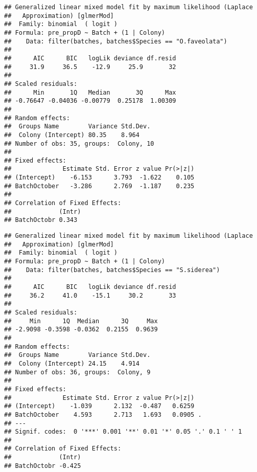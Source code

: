 \documentclass[]{article}
\newenvironment{Shaded}{\begin{snugshade}}{\end{snugshade}}
\newcommand{\CommentTok}[1]{\textcolor[rgb]{0.56,0.35,0.01}{\textit{#1}}}
\newcommand{\DataTypeTok}[1]{\textcolor[rgb]{0.13,0.29,0.53}{#1}}
\newcommand{\DecValTok}[1]{\textcolor[rgb]{0.00,0.00,0.81}{#1}}
\newcommand{\KeywordTok}[1]{\textcolor[rgb]{0.13,0.29,0.53}{\textbf{#1}}}
\newcommand{\NormalTok}[1]{#1}
\newcommand{\OperatorTok}[1]{\textcolor[rgb]{0.81,0.36,0.00}{\textbf{#1}}}
\newcommand{\StringTok}[1]{\textcolor[rgb]{0.31,0.60,0.02}{#1}}
\begin{document}
\begin{verbatim}
## Generalized linear mixed model fit by maximum likelihood (Laplace
##   Approximation) [glmerMod]
##  Family: binomial  ( logit )
## Formula: pre_propD ~ Batch + (1 | Colony)
##    Data: filter(batches, batches$Species == "O.faveolata")
## 
##      AIC      BIC   logLik deviance df.resid 
##     31.9     36.5    -12.9     25.9       32 
## 
## Scaled residuals: 
##      Min       1Q   Median       3Q      Max 
## -0.76647 -0.04036 -0.00779  0.25178  1.00309 
## 
## Random effects:
##  Groups Name        Variance Std.Dev.
##  Colony (Intercept) 80.35    8.964   
## Number of obs: 35, groups:  Colony, 10
## 
## Fixed effects:
##              Estimate Std. Error z value Pr(>|z|)
## (Intercept)    -6.153      3.793  -1.622    0.105
## BatchOctober   -3.286      2.769  -1.187    0.235
## 
## Correlation of Fixed Effects:
##             (Intr)
## BatchOctobr 0.343
\end{verbatim}

\begin{Shaded}
\end{Shaded}

\begin{verbatim}
## Generalized linear mixed model fit by maximum likelihood (Laplace
##   Approximation) [glmerMod]
##  Family: binomial  ( logit )
## Formula: pre_propD ~ Batch + (1 | Colony)
##    Data: filter(batches, batches$Species == "S.siderea")
## 
##      AIC      BIC   logLik deviance df.resid 
##     36.2     41.0    -15.1     30.2       33 
## 
## Scaled residuals: 
##     Min      1Q  Median      3Q     Max 
## -2.9098 -0.3598 -0.0362  0.2155  0.9639 
## 
## Random effects:
##  Groups Name        Variance Std.Dev.
##  Colony (Intercept) 24.15    4.914   
## Number of obs: 36, groups:  Colony, 9
## 
## Fixed effects:
##              Estimate Std. Error z value Pr(>|z|)  
## (Intercept)    -1.039      2.132  -0.487   0.6259  
## BatchOctober    4.593      2.713   1.693   0.0905 .
## ---
## Signif. codes:  0 '***' 0.001 '**' 0.01 '*' 0.05 '.' 0.1 ' ' 1
## 
## Correlation of Fixed Effects:
##             (Intr)
## BatchOctobr -0.425
\end{verbatim}
\end{document}
